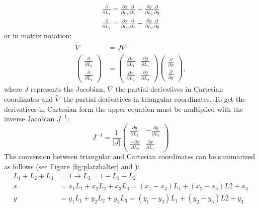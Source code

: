 \documentclass[11pt,twoside]{scrartcl}
\begin{document}
  \begin{align}
  \frac{\partial}{\partial L_1} = \frac{\partial x}{\partial L_1} \frac{\partial}{\partial x} + \frac{\partial y}{\partial L_1} \frac{\partial}{\partial y} \nonumber\\
  \frac{\partial}{\partial L_2} = \frac{\partial x}{\partial L_2} \frac{\partial}{\partial x} + \frac{\partial y}{\partial L_2} \frac{\partial}{\partial y}
  \end{align}
  or in matrix notation:
  \begin{align}
  \tilde{\nabla} &= \underline{J} \nabla \nonumber\\
  \begin{pmatrix}
  \frac{\partial}{\partial L_1}\\ \frac{\partial}{\partial L_2}
  \end{pmatrix} &= \begin{pmatrix}
  \frac{\partial x}{\partial L_1} & \frac{\partial y}{\partial L_1}\\
  \frac{\partial x}{\partial L_2} & \frac{\partial y}{\partial L_2}
  \end{pmatrix} \begin{pmatrix}
  \frac{\partial}{\partial x}\\ \frac{\partial}{\partial y}
  \end{pmatrix},
  \end{align}
  where $\underline{J}$ represents the Jacobian, $\nabla$ the partial derivatives in Cartesian coordinates and $\tilde{\nabla}$ the partial derivatives in triangular coordinates. To get the derivatives in Cartesian form the upper equation must be multiplied with the inverse Jacobian $\underline{J}^{-1}$:
  \begin{equation}
  \underline{J}^{-1} = \frac{1}{|\underline{J}|} \begin{pmatrix}
  \frac{\partial y}{\partial L_2} & -\frac{\partial y}{\partial L_1} \\
  \frac{-\partial x}{\partial L_2} & \frac{\partial x}{\partial L_1}
  \end{pmatrix}
  \end{equation}
  The conversion between triangular and Cartesian coordinates can be summarized as follows (see Figure \ref{fig:platzhalter} and \cite{steinke2005finite}):
  \begin{align}\label{eq:triCoord<->CartCoord}
  L_1 + L_2 + L_3 &= 1 \rightarrow L_3 = 1-L_1-L_2 \nonumber\\
  x &= x_1L_1 + x_2L_2 + x_3L_3 = (x_1-x_3)L_1 + (x_2-x_3)L2 + x_3\\
  y &= y_1L_1 + y_2L_2 + y_3L_3 = (y_1-y_3)L_1 + (y_2-y_3)L2 + y_3 \nonumber
  \end{align}
\end{document}
